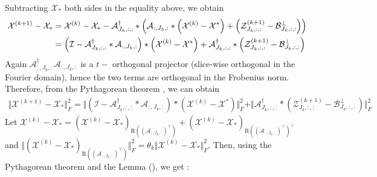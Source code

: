 \documentclass[aspectratio=169]{beamer}
\def\fm#1{\mathcal{#1}}
\def\m#1{\boldsymbol{#1}}
\def \ai#1{\m A_{I_{#1}, :}}
\def\fm#1{\mathcal{#1}}
\def\m#1{\boldsymbol{#1}}
\def \a#1{\fm A_{:, #1, :}}
\def \ai#1{\fm A_{#1, :, :}}
\def \z#1#2{\fm Z^{(#1)}_{#2, :, :}}
\def \bp#1{\fm B^{\perp}_{#1, :, :}}
\def \x#1{\fm X^{(#1)}}
\begin{document}
\begin{frame}{}
\scriptsize
Subtracting $\fm X_\ast$  both sides  in the equality above, we obtain
\begin{align}
   \x {k+1} - \fm X_\ast  & =  \x{k} - \fm X_\ast  - \ai{J_k}^\dagger * \left( \a{J_k} *\left(\x k - \fm X^\ast \right) + \left(\z{k+1}{J_k} - \bp{J_k}  \right)\right) \notag\\
   & =  \left( \fm I - \ai{J_k}^\dagger *  \a{J_k} \right) *\left(\x k - \fm X^\ast   \right) +  \ai{J_k}^\dagger* \left(\z{k+1}{J_k} - \bp{J_k}  \right)
\end{align}
Again $\a{J_k}^\dagger \a{J_k}$ is a $t-$ orthogonal projector  (slice-wise  orthogonal in the Fourier  domain), hence the two terms are orthogonal in the Frobenius norm. Therefore,  from the  Pythagorean theorem , we can obtain
\begin{align}
    \Vert \x{k+1} - \fm X_\ast \Vert_F^2 = \Vert \left( \fm I - \ai{J_k}^\dagger *  \a{J_k} \right) *\left(\x k - \fm X^\ast   \right) \Vert_F^2  +  \Vert  \ai{J_k}^\dagger* \left(\z{k+1}{J_k} - \bp{J_k}  \right) \Vert_F^2  \label{eq:eq-5}
\end{align}
Let  $\x{k}-\fm X_\ast = \left( \x{k} - \fm X_\ast \right)_{\text{R}((\a{J_k})^\top)} + \left(\x k - \fm X_\ast \right)_{\text{R}((\a{J_k})^\top)^\perp }$ and $\Vert \left( \x{k} - \fm X_\ast \right)_{\text{R}((\a{J_k})^\top)} \Vert_F^2  = \theta_k \Vert \x k - \fm X_\ast \Vert_F^2$. Then, using the Pythagorean theorem and the  Lemma (), we get : 
\end{frame}
\end{document}
